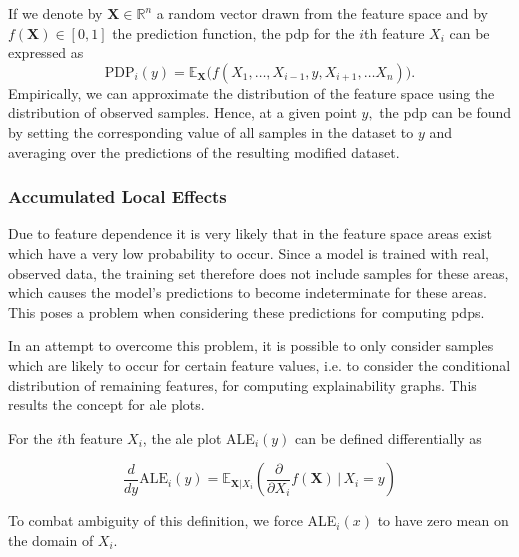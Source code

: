 \documentclass[10pt,sigconf,letterpaper,dvipsnames]{acmart}
\newcommand\note[2]{{\color{#1}#2}}
\newcommand\todo[1]{{\note{red}{TODO: #1}}}
\begin{document}
If we denote by $\boldsymbol X \in \mathbb R ^n$ a random vector drawn from the feature space and by $f(\boldsymbol X) \in [0,1]$ the  prediction function, the \gls{pdp} for the $i$th feature $X_i$ can be expressed as
\begin{equation}
\text{PDP}_i(y) = \mathbb E_{\boldsymbol X}\Big(f(X_1,\ldots,X_{i-1},y,X_{i+1},\ldots X_n)\Big) . %
\end{equation}
Empirically, we can approximate the distribution of the feature space using the distribution of observed samples. Hence, at a given point $y,$ the \gls{pdp} can be found by setting the corresponding value of all samples in the dataset to $y$ and averaging over the predictions of the resulting modified dataset.

\subsubsection{Accumulated Local Effects}
Due to feature dependence it is very likely that in the feature space areas exist which have a very low probability to occur. Since a model is trained with real, observed data, the training set therefore does not include samples for these areas, which causes the model's predictions to become indeterminate for these areas. This poses a problem when considering these predictions for computing \glspl{pdp}.

In an attempt to overcome this problem, it is possible to only consider samples which are likely to occur for certain feature values, i.e. to consider the conditional distribution of remaining features, for computing explainability graphs. This results the concept for \gls{ale} plots.

For the $i$th feature $X_i$, the \gls{ale} plot ALE$_i(y)$ can be defined differentially as



\begin{equation}
\frac{d}{dy} \text{ALE}_i (y) = \mathbb E_{\boldsymbol X | X_i}\left(\frac{\partial}{\partial X_i} f(\boldsymbol X) \, \Big \vert \, X_i=y\right)
\end{equation}

To combat ambiguity of this definition, we force ALE$_i(x)$ to have zero mean on the domain of $X_i$.
\end{document}
